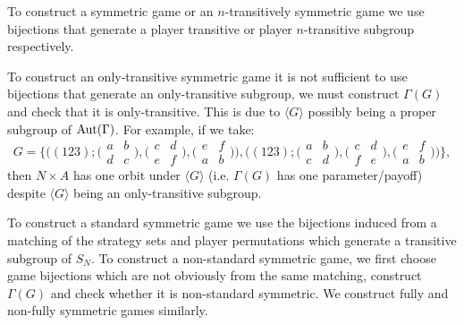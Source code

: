 	To construct a symmetric game or an $n$-transitively symmetric game we use bijections that generate a player transitive  or player $n$-transitive subgroup respectively. 
	
	To construct an only-transitive symmetric game it is not sufficient to use bijections that generate an only-transitive subgroup, we must construct $\Gamma(G)$ and check that it is only-transitive. This is due to $\langle{G}\rangle$ possibly being a proper subgroup of $\operatorname*{Aut}(\Gamma)$. For example, if we take:
	\[G = \{ \bigl((123) ; \bigl(\begin{smallmatrix} a & b \\ d & c \end{smallmatrix}\bigr), \bigl(\begin{smallmatrix} c & d \\ e & f \end{smallmatrix}\bigr), \bigl(\begin{smallmatrix} e & f \\ a & b \end{smallmatrix}\bigr)\bigr),
               \bigl((123) ; \bigl(\begin{smallmatrix} a & b \\ c & d \end{smallmatrix}\bigr), \bigl(\begin{smallmatrix} c & d \\ f & e \end{smallmatrix}\bigr), \bigl(\begin{smallmatrix} e & f \\ a & b \end{smallmatrix}\bigr)\bigr) \},\] 
    then $N\times{A}$ has one orbit under $\langle{G}\rangle$ (i.e. $\Gamma(G)$ has one parameter/payoff) despite $\langle{G}\rangle$ being an only-transitive subgroup.    
        
	To construct a standard symmetric game we use the bijections induced from a matching of the strategy sets and player permutations which generate a transitive subgroup of $S_N$. To construct a non-standard symmetric game, we first choose game bijections which are not obviously from the same matching, construct $\Gamma(G)$ and check whether it is non-standard symmetric. We construct fully and non-fully symmetric games similarly.
	
